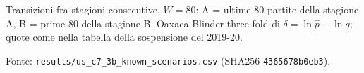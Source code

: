 \begin{table}[htbp]
\smallskip
\begin{minipage}{\linewidth}
\footnotesize
Transizioni fra stagioni consecutive, $W = 80$: A = ultime 80 partite della stagione A, B = prime 80 della stagione B. Oaxaca-Blinder three-fold di $\delta = \ln \hat p - \ln q$; quote come nella tabella della sospensione del 2019-20.\par
Fonte: \texttt{results/us\_c7\_3b\_known\_scenarios.csv} (SHA256 \texttt{4365678b0eb3}).
\end{minipage}
\end{table}
